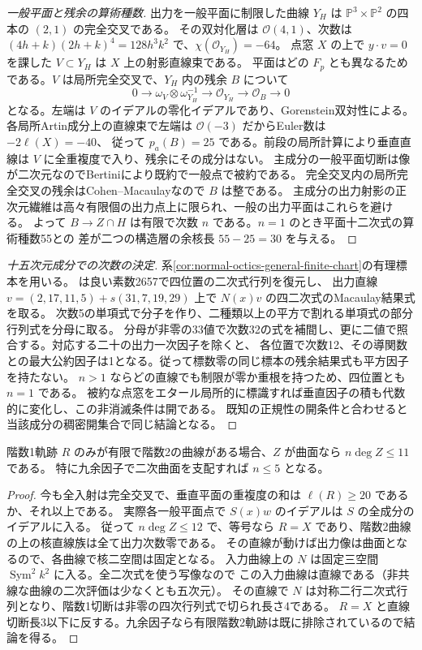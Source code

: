 \begin{proof}[一般平面と残余の算術種数]
出力を一般平面に制限した曲線 $Y_H$ は $\mathbb P^3\times\mathbb P^2$ の四本の $(2,1)$ の完全交叉である。
その双対化層は $\mathcal O(4,1)$、次数は $(4h+k)(2h+k)^4=128h^3k^2$ で、$\chi(\mathcal O_{Y_H})=-64$。
点窓 $X$ の上で $y\cdot v=0$ を課した $V\subset Y_H$ は $X$ 上の射影直線束である。
平面はどの $F_p$ とも異なるためである。$V$ は局所完全交叉で、$Y_H$ 内の残余 $B$ について
\[
 0\longrightarrow\omega_V\otimes\omega_{Y_H}^{-1}\longrightarrow\mathcal O_{Y_H}
       \longrightarrow\mathcal O_B\longrightarrow0
\]
となる。左端は $V$ のイデアルの零化イデアルであり、Gorenstein双対性による。
各局所Artin成分上の直線束で左端は $\mathcal O(-3)$ だからEuler数は $-2\ell(X)=-40$、
従って $p_a(B)=25$ である。前段の局所計算により垂直直線は $V$ に全重複度で入り、残余にその成分はない。
主成分の一般平面切断は像が二次元なのでBertiniにより既約で一般点で被約である。
完全交叉内の局所完全交叉の残余はCohen--Macaulayなので $B$ は整である。
主成分の出力射影の正次元繊維は高々有限個の出力点上に限られ、一般の出力平面はこれらを避ける。
よって $B\to Z\cap H$ は有限で次数 $n$ である。$n=1$ のとき平面十二次式の算術種数55との
差が二つの構造層の余核長 $55-25=30$ を与える。
\end{proof}

\begin{proof}[十五次元成分での次数の決定]
系\ref{cor:normal-octics-general-finite-chart}の有理標本を用いる。
 は良い素数2657で四位置の二次式行列を復元し、
出力直線 $v=(2,17,11,5)+s(31,7,19,29)$ 上で $N(x)v$ の四二次式のMacaulay結果式を取る。
次数5の単項式で分子を作り、二種類以上の平方で割れる単項式の部分行列式を分母に取る。
分母が非零の33値で次数32の式を補間し、更に二値で照合する。対応する二十の出力一次因子を除くと、
各位置で次数12、その導関数との最大公約因子は1となる。従って標数零の同じ標本の残余結果式も平方因子を持たない。
$n>1$ ならどの直線でも制限が零か重根を持つため、四位置とも $n=1$ である。
被約な点窓をエタール局所的に標識すれば垂直因子の積も代数的に変化し、この非消滅条件は開である。
既知の正規性の開条件と合わせると当該成分の稠密開集合で同じ結論となる。
\end{proof}

\begin{corollary}\label{cor:excess-kernel-degree-eleven}
階数1軌跡 $R$ のみが有限で階数2の曲線がある場合、$Z$ が曲面なら $n\deg Z\le11$ である。
特に九余因子で二次曲面を支配すれば $n\le5$ となる。
\end{corollary}
\begin{proof}
今も全入射は完全交叉で、垂直平面の重複度の和は $\ell(R)\ge20$ であるか、それ以上である。
実際各一般平面点で $S(x)w$ のイデアルは $S$ の全成分のイデアルに入る。
従って $n\deg Z\le12$ で、等号なら $R=X$ であり、階数2曲線の上の核直線族は全て出力次数零である。
その直線が動けば出力像は曲面となるので、各曲線で核二空間は固定となる。
入力曲線上の $N$ は固定三空間 $\operatorname{Sym}^2 k^2$ に入る。全二次式を使う写像なので
この入力曲線は直線である（非共線な曲線の二次評価は少なくとも五次元）。
その直線で $N$ は対称二行二次式行列となり、階数1切断は非零の四次行列式で切られ長さ4である。
$R=X$ と直線切断長3以下に反する。九余因子なら有限階数2軌跡は既に排除されているので結論を得る。
\end{proof}
